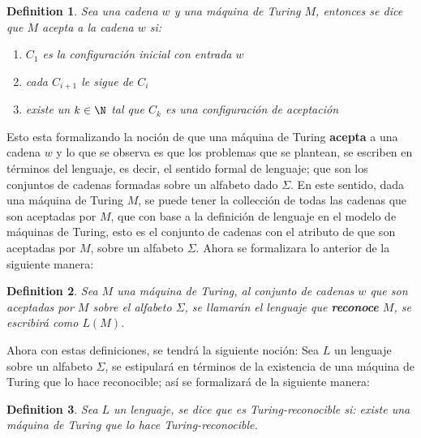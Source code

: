 \documentclass[10pt]{report}
\newtheorem{definition}{Definition}
\begin{document}
    \begin{definition}
        Sea una cadena $w$ y una máquina de Turing $M$,\newline
        entonces se dice que $M$ acepta a la cadena $w$ si:
        \begin{enumerate}
            \item $C_{1}$ es la configuración inicial con entrada $w$
            \item cada $C_{i+1}$ le sigue de $C_{i}$
            \item existe un $k \in \N$ tal que $C_{k}$ es una configuración de aceptación
        \end{enumerate}
    \end{definition}
    Esto esta formalizando la noción de que una máquina de Turing \textbf{acepta} a una cadena $w$
    y lo que se observa es que los problemas que se plantean, se
    escriben en términos del lenguaje, es decir, el sentido formal de lenguaje; que son los
    conjuntos de cadenas formadas sobre un alfabeto dado $\Sigma$.
    \newpage
    En este sentido, dada una máquina de Turing $M$, se puede tener la collección de todas
    las cadenas que son aceptadas por $M$, que con base a la definición de lenguaje en el modelo de máquinas de Turing,
    esto es el conjunto de cadenas con el atributo de que son aceptadas por $M$, sobre un alfabeto $\Sigma$.
    \newline
    Ahora se formalizara lo anterior de la siguiente manera:
    \begin{definition}
        Sea $M$ una máquina de Turing, al conjunto de cadenas $w$ que son aceptadas por $M$ sobre el alfabeto $\Sigma$,
        se llamarán el lenguaje que \textbf{reconoce} $M$, se escribirá como $L(M)$.

    \end{definition}
    \newline
    Ahora con estas definiciones, se tendrá la siguiente noción: \newline Sea $L$ un lenguaje sobre un alfabeto $\Sigma$,
    se estipulará en términos de la existencia de una máquina de Turing que lo hace reconocible;
    así se formalizará de la siguiente manera: \newline

    \begin{definition}
        Sea $L$ un lenguaje, se dice que es Turing-reconocible si:
        existe una máquina de Turing que lo hace Turing-reconocible.
    \end{definition}
\end{document}
